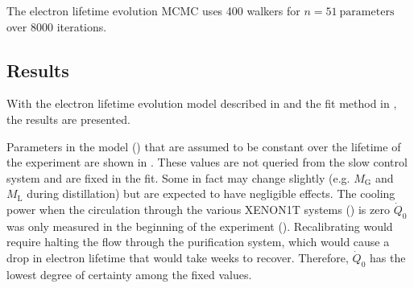 The electron lifetime evolution MCMC uses 400 walkers for $n = 51\ \mathrm{parameters}$ over 8000 iterations.



\subsection{Results}
\label{subsec:elifetime_fit_results}
With the electron lifetime evolution model described in  and the fit method in
, the results are presented.

Parameters in the model () that are assumed to be constant over the lifetime of the experiment are shown in
.  These values are not queried from the slow control system and are fixed in the
fit.  Some in fact may change slightly (e.g. $M_{\mathrm{G}}$ and $M_{\mathrm{L}}$ during distillation) but are expected to have negligible
effects.  The cooling power when the circulation through the various XENON1T systems () is zero
$\dot{Q}_0$ was only measured in the beginning of the experiment ().  Recalibrating
would require halting the flow through the purification system, which would cause a drop in electron lifetime that would take weeks to
recover.  Therefore, $\dot{Q}_0$ has the lowest degree of certainty among the fixed values.

\begin{table}
\centering
{}
\caption{Parameters in the electron lifetime evolution model that are fixed.}
\label{tab:elifetime_fit_results_posteriors_fixed}
\end{table}

